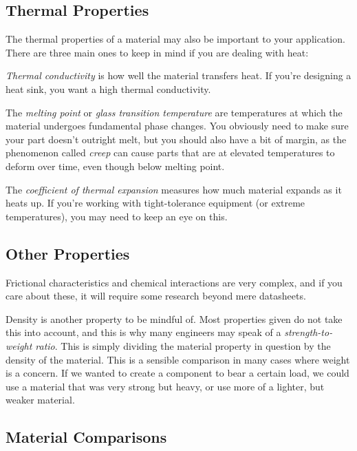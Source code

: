  \subsection{Thermal Properties}
 The thermal properties of a material may also be important to your application. There are three main ones to keep in mind if you are dealing with heat:
 \begin{asparaitem}[ ]
 	\item \textit{Thermal conductivity} is how well the material transfers heat. If you're designing a heat sink, you want a high thermal conductivity.
 	\item The \textit{melting point} or \textit{glass transition temperature} are temperatures at which the material undergoes fundamental phase changes. You obviously need to make sure your part doesn't outright melt, but you should also have a bit of margin, as the phenomenon called \textit{creep} can cause parts that are at elevated temperatures to deform over time, even though below melting point.
 	\item The \textit{coefficient of thermal expansion} measures how much material expands as it heats up. If you're working with tight-tolerance equipment (or extreme temperatures), you may need to keep an eye on this.
 \end{asparaitem}
  
\subsection{Other Properties} 
 
 Frictional characteristics and chemical interactions are very complex, and if you care about these, it will require some research beyond mere datasheets.
 
 Density is another property to be mindful of. Most properties given do not take this into account, and this is why many engineers may speak of a \textit{strength-to-weight ratio}. This is simply dividing the material property in question by the density of the material. This is a sensible comparison in many cases where weight is a concern. If we wanted to create a component to bear a certain load, we could use a material that was very strong but heavy, or use more of a lighter, but weaker material.
 
 \subsection{Material Comparisons}
 
